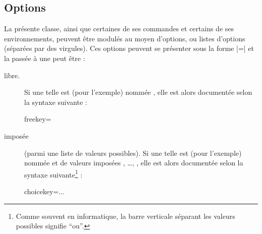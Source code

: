 \documentclass[english,nolocaltoc]{nwejmart}
\newtheorem[style=definition]{fait}
\newtheorem[title=expérience]{experience}
\newtheorem[title-plural=anneaux]{anneau}
\newtheorem[title=idéal,title-plural=idéaux]{ideal}
\begin{document}
\subsection{Options}
\label{sec-options}

La présente classe, ainsi que certaines de ses commandes et certains de ses
environnements, peuvent être modulés au moyen d'options, ou listes d'options
(séparées par des virgules). Ces options peuvent se présenter sous la forme
|=| et la  passée à une  peut
être :
\begin{description}
\item[libre.] Si une telle  est (pour l'exemple) nommée
  , elle est alors documentée selon la syntaxe suivante :
  \begin{docKey*}{freekey}{=}{}
  \end{docKey*}
\item[imposée] (parmi une liste de valeurs possibles). Si une telle  est
   (pour l'exemple) nommée  et de valeurs imposées
  , \dots{}, , elle est alors
  documentée selon la syntaxe suivante\footnote{Comme souvent en informatique,
    la barre verticale séparant les valeurs possibles signifie \enquote{ou}.} :
  \begin{docKey*}{choicekey}{=\textbar...\textbar{}}{}
  \end{docKey*}
\end{description}
\end{document}
